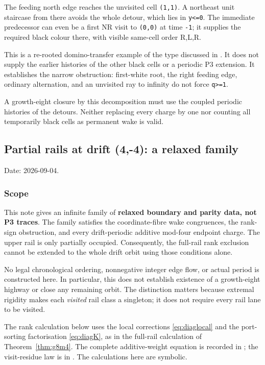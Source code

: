 \documentclass[11pt,letterpaper]{article}
\theoremstyle{plain}
\theoremstyle{definition}
\begin{document}
\begin{NoHyper}
The feeding north edge reaches the unvisited cell \texttt{(1,1)}. A northeast unit staircase from there avoids the whole detour, which lies in \texttt{y\textless{}=0}. The immediate predecessor can even be a first NR visit to \texttt{(0,0)} at time \texttt{-1}; it supplies the required black colour there, with visible same-cell order R,L,R.

This is a re-rooted domino-transfer example of the type discussed in . It does not supply the earlier histories of the other black cells or a periodic P3 extension. It establishes the narrow obstruction: first-white root, the right feeding edge, ordinary alternation, and an unvisited ray to infinity do not force \texttt{q\textgreater{}=1}.

A growth-eight closure by this decomposition must use the coupled periodic histories of the detours. Neither replacing every charge by one nor counting all temporarily black cells as permanent wake is valid.


\subsection{Partial rails at drift (4,-4): a relaxed family}

Date: 2026-09-04.

\subsubsection{Scope}

This note gives an infinite family of \textbf{relaxed boundary and parity data, not P3 traces}. The family satisfies the coordinate-fibre wake congruences, the rank-sign obstruction, and every drift-periodic additive mod-four endpoint charge. The upper rail is only partially occupied. Consequently, the full-rail rank exclusion cannot be extended to the whole drift orbit using those conditions alone.

No legal chronological ordering, nonnegative integer edge flow, or actual period is constructed here. In particular, this does not establish existence of a growth-eight highway or close any remaining orbit. The distinction matters because extremal rigidity makes each \emph{visited} rail class a singleton; it does not require every rail lane to be visited.

The rank calculation below uses the local corrections \eqref{eq:diaglocal} and the port-sorting factorisation \eqref{eq:diagK}, as in the full-rail calculation of Theorem~\ref{thm:g8m4}. The complete additive-weight equation is recorded in ; the visit-residue law is in . The calculations here are symbolic.


\end{NoHyper}
\end{document}
